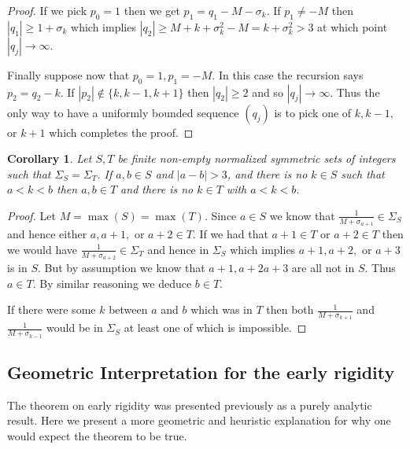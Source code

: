 \documentclass[11pt]{amsart}
\newtheorem{corollary}[theorem]{Corollary}
\numberwithin{theorem}{section} %
\numberwithin{corollary}{section}
\numberwithin{lemma}{section}
\numberwithin{proposition}{section}
\numberwithin{definition}{section}
\begin{document}
\begin{proof}
If we pick $p_0 = 1$ then we get $p_1 = q_1 - M - \sigma_k$. If $p_1 \neq -M$ then $|q_1| \geqslant 1+\sigma_k$ which implies $|q_2| \geqslant M+k+\sigma_k^2 - M = k + \sigma_k^2 > 3$ at which point $|q_j| \rightarrow \infty$.

Finally suppose now that $p_0 = 1, p_1 = -M$. In this case the recursion says $p_2 = q_2 - k$. If $|p_2| \notin \{k, k-1, k+1 \}$ then $|q_2| \geqslant 2$ and so $|q_j| \rightarrow \infty$. Thus the only way to have a uniformly bounded sequence $(q_j)$ is to pick one of $k, k-1,$ or $k+1$ which completes the proof.

\end{proof}





\begin{corollary}
Let $S, T$ be finite non-empty normalized symmetric sets of integers such that $\Sigma_S = \Sigma_T$. If $a, b \in S$ and $|a-b| > 3$, and there is no $k \in S$ such that $a < k < b$ then $a, b \in T$ and there is no $k \in T$ with $a < k < b$.
\end{corollary}

\begin{proof}
Let $M = \max(S) = \max(T)$. Since $a \in S$ we know that $\frac{1}{M+ \sigma_{a+1}} \in \Sigma_S$ and hence either $a, a+1,$ or $a+2 \in T$. If we had that $a+1 \in T$ or $a+2 \in T$ then we would have $\frac{1}{M+\sigma_{a+2}} \in \Sigma_T$ and hence in $\Sigma_S$ which implies $a+1, a+2,$ or $a+3$ is in $S$. But by assumption we know that $a+1, a+2 a+3$ are all not in $S$. Thus $a \in T$. By similar reasoning we deduce $b \in T$.

If there were some $k$ between $a$ and $b$ which was in $T$ then both $\frac{1}{M+\sigma_{k+1}}$ and $\frac{1}{M+\sigma_{k-1}}$ would be in $\Sigma_S$ at least one of which is impossible.
\end{proof}











\subsection{Geometric Interpretation for the early rigidity}

The theorem on early rigidity was presented previously as a purely analytic result. Here we present a more geometric and heuristic explanation for why one would expect the theorem to be true.
\end{document}
